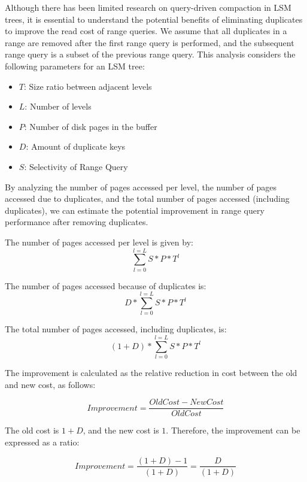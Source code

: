 \documentclass[balance=false, sigconf]{acmart}
\begin{document}
Although there has been limited research on query-driven compaction in LSM trees, it is 
essential to understand the potential benefits of eliminating duplicates to improve the 
read cost of range queries. 
We assume that all duplicates in a range are removed after the first range query is 
performed, and the subsequent range query is a subset of the previous range query. 
This analysis considers the following parameters for an LSM tree:

\begin{itemize}
\item $T$: Size ratio between adjacent levels
\item $L$: Number of levels
\item $P$: Number of disk pages in the buffer
\item $D$: Amount of duplicate keys
\item $S$: Selectivity of Range Query
\end{itemize}

By analyzing the number of pages accessed per level, the number of pages accessed due to 
duplicates, and the total number of pages accessed (including duplicates), we can estimate 
the potential improvement in range query performance after removing duplicates.

The number of pages accessed per level is given by:
\begin{equation}
  \sum_{l=0}^{l=L} S * P * T^l
\end{equation}

The number of pages accessed because of duplicates is:
\begin{equation}
  D * \sum_{l=0}^{l=L} S * P * T^l
\end{equation}

The total number of pages accessed, including duplicates, is:
\begin{equation}
  (1 + D) * \sum_{l=0}^{l=L} S * P * T^l
\end{equation}

The improvement is calculated as the relative reduction in cost between the old 
and new cost, as follows:

\begin{equation}
Improvement = \frac{OldCost-NewCost}{OldCost}
\end{equation}

The old cost is $1 + D$, and the new cost is $1$. Therefore, the improvement 
can be expressed as a ratio:

\begin{equation}
Improvement = \frac{(1 + D) - 1}{(1 + D)} = \frac{D}{(1 + D)}
\end{equation}
\end{document}
